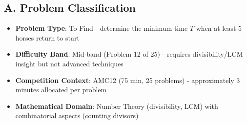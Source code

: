 \documentclass[]{article}
\begin{document}
\begin{problemconfigbox}
\subsection*{A. Problem Classification}
\begin{itemize}[leftmargin=*]
    \item \textbf{Problem Type}: To Find - determine the minimum time $T$ when at least 5 horses return to start
    \item \textbf{Difficulty Band}: Mid-band (Problem 12 of 25) - requires divisibility/LCM insight but not advanced techniques
    \item \textbf{Competition Context}: AMC12 (75 min, 25 problems) - approximately 3 minutes allocated per problem
    \item \textbf{Mathematical Domain}: Number Theory (divisibility, LCM) with combinatorial aspects (counting divisors)
\end{itemize}


\end{problemconfigbox}
\end{document}
